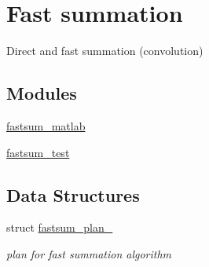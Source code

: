 \hypertarget{group__applications__fastsum}{\section{Fast summation}
\label{group__applications__fastsum}
}


Direct and fast summation (convolution)  


\subsection*{Modules}
\begin{DoxyCompactItemize}
\item 
\hyperlink{group__applications__fastsum__matlab}{fastsum\-\_\-matlab}
\item 
\hyperlink{group__applications__fastsum__test}{fastsum\-\_\-test}
\end{DoxyCompactItemize}
\subsection*{Data Structures}
\begin{DoxyCompactItemize}
\item 
struct \hyperlink{structfastsum__plan__}{fastsum\-\_\-plan\-\_\-}
\begin{DoxyCompactList}\small\item\em plan for fast summation algorithm \end{DoxyCompactList}\end{DoxyCompactItemize}
